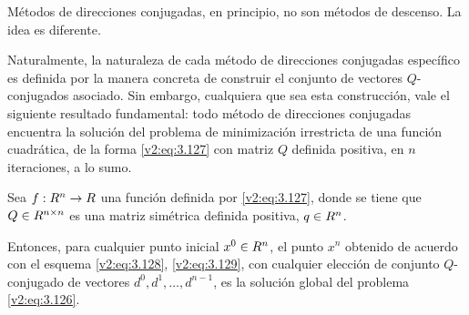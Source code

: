 Métodos de direcciones conjugadas, en principio, no son métodos de descenso. La idea es diferente.

Naturalmente, la naturaleza de cada método de direcciones conjugadas específico es definida por la manera concreta de construir el conjunto de vectores $Q$-conjugados asociado. Sin embargo, cualquiera que sea esta construcción, vale el siguiente resultado fundamental: todo método de direcciones conjugadas encuentra la solución del problema de minimización irrestricta de una función cuadrática, de la forma \eqref{v2:eq:3.127} con matriz $Q$ definida positiva, en $n$ iteraciones, a lo sumo.

\begin{theorem}\label{v2:thm:3.4.1}
    Sea $f : R^n \to R$ una función definida por \eqref{v2:eq:3.127}, donde se tiene que $Q \in R^{n \times n}$ es una matriz simétrica definida positiva, $q \in R^n$.
    
    Entonces, para cualquier punto inicial $x^0 \in R^n$, el punto $x^n$ obtenido de acuerdo con el esquema \eqref{v2:eq:3.128}, \eqref{v2:eq:3.129}, con cualquier elección de conjunto $Q$-conjugado de vectores $d^0, d^1, \dots, d^{n-1}$, es la solución global del problema \eqref{v2:eq:3.126}.
\end{theorem}

